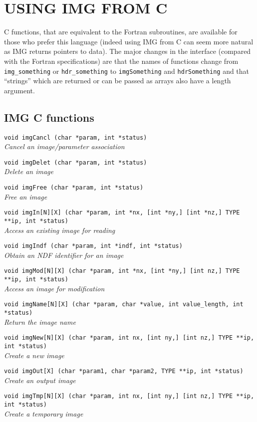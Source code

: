 \documentclass[twoside,11pt,nolof]{starlink}
\providecommand{\myverb}[1]{{\texttt{#1}}}
\begin{document}
\newpage

\section{USING IMG FROM C\label{IMGCinterface}}

C functions, that are equivalent to the Fortran subroutines, are
available for those who prefer this language (indeed using IMG from C
can seem more natural as IMG returns pointers to data).  The major
changes in the interface (compared with the Fortran specifications)
are that the names of functions change from \myverb{img\_something} or
\myverb{hdr\_something} to \myverb{imgSomething} and
\myverb{hdrSomething} and that ``strings'' which are returned or can
be passed as arrays also have a length argument.

\providecommand{\cnoteroutine}[4]{
   \item {\small \texttt{#1~#2 #3}} \nopagebreak \\ \emph{#4 }
}
\subsection{IMG C functions}

\begin{small}
\begin{description}
  \cnoteroutine{void}{imgCancl}{(char *param, int *status)}
     {Cancel an image/parameter association}
  \cnoteroutine{void}{imgDelet}{(char *param, int *status)}
     {Delete an image}
  \cnoteroutine{void}{imgFree}{(char *param, int *status)}
     {Free an image}
  \cnoteroutine{void}{imgIn[N][X]}
     {(char *param, int *nx, [int *ny,] [int *nz,] TYPE **ip, int *status)}
     {Access an existing image for reading}
  \cnoteroutine{void}{imgIndf}{(char *param, int *indf, int *status)}
     {Obtain an NDF identifier for an image}
  \cnoteroutine{void}{imgMod[N][X]}
     {(char *param, int *nx, [int *ny,] [int nz,] TYPE **ip, int *status)}
     {Access an image for modification}
  \cnoteroutine{void}{imgName[N][X]}
     {(char *param, char *value, int value\_length, int *status)}
     {Return the image name}
  \cnoteroutine{void}{imgNew[N][X]}
     {(char *param, int nx, [int ny,] [int nz,] TYPE **ip, int *status)}
     {Create a new image}
  \cnoteroutine{void}{imgOut[X]}
     {(char *param1, char *param2, TYPE **ip, int *status)}
     {Create an output image}
  \cnoteroutine{void}{imgTmp[N][X]}
     {(char *param, int nx, [int ny,] [int nz,] TYPE **ip, int *status)}
     {Create a temporary image}
\end{description}
\end{small}
\end{document}
